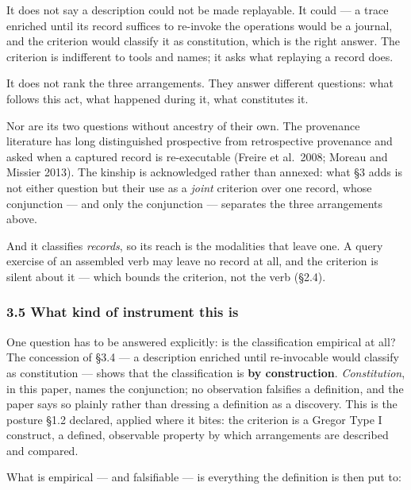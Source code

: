\documentclass[
]{article}
\begin{document}
It does not say a description could not be made replayable. It could ---
a trace enriched until its record suffices to re-invoke the operations
would be a journal, and the criterion would classify it as constitution,
which is the right answer. The criterion is indifferent to tools and
names; it asks what replaying a record does.

It does not rank the three arrangements. They answer different
questions: what follows this act, what happened during it, what
constitutes it.

Nor are its two questions without ancestry of their own. The provenance
literature has long distinguished prospective from retrospective
provenance and asked when a captured record is re-executable (Freire et
al.~2008; Moreau and Missier 2013). The kinship is acknowledged rather
than annexed: what §3 adds is not either question but their use as a
\emph{joint} criterion over one record, whose conjunction --- and only
the conjunction --- separates the three arrangements above.

And it classifies \emph{records}, so its reach is the modalities that
leave one. A query exercise of an assembled verb may leave no record at
all, and the criterion is silent about it --- which bounds the
criterion, not the verb (§2.4).

\subsubsection{3.5 What kind of instrument this
is}\label{what-kind-of-instrument-this-is}

One question has to be answered explicitly: is the classification
empirical at all? The concession of §3.4 --- a description enriched
until re-invocable would classify as constitution --- shows that the
classification is \textbf{by construction}. \emph{Constitution}, in this
paper, names the conjunction; no observation falsifies a definition, and
the paper says so plainly rather than dressing a definition as a
discovery. This is the posture §1.2 declared, applied where it bites:
the criterion is a Gregor Type I construct, a defined, observable
property by which arrangements are described and compared.

What is empirical --- and falsifiable --- is everything the definition
is then put to:
\end{document}
